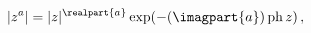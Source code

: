 \[|z^{a}|=|z|^{\realpart{a}}\mathop{\exp\/}\nolimits\!\left(-(\imagpart{a})%
\mathop{\mathrm{ph}\/}\nolimits z\right),\]